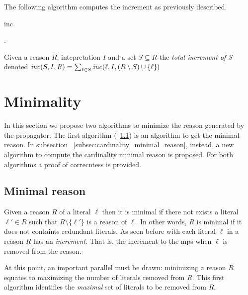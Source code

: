 The following algorithm computes the increment as previously described.
\begin{algorithm}[h]\small
    \caption{inc}
        \label{alg:increment}
        .
\end{algorithm}

Given a reason $R$, intepretation $I$ and a set $S \subseteq R$
the \textit{total increment of S} denoted $\mathit{inc}(S,I,R) = \sum_{\ell \in S} \mathit{inc}(\ell, I, (R \setminus S)\cup \{\ell\})$ 

\section{Minimality}
\label{sec:minimality}
In this section we  propose two algorithms to minimize the reason 
generated by the propagator. The first algorithm  (~\ref{subsec:minimal_reason}) is an algorithm
to get the minimal reason.
In subsection ~\ref{subsec:cardinality_minimal_reason}, instead,
a new algorithm to compute the cardinality minimal reason is proposed.
For both algorithms a proof of correcntess is provided.

\subsection{Minimal reason}
\label{subsec:minimal_reason}

Given a reason $R$ of a literal $\ell$ then it is minimal if there  not exists 
a literal $\ell' \in R$ such that $R \setminus \{\ell'\}$ is a reason of 
$\ell$. In other words, $R$ is minimal if it does not containts redundant literals.
As seen before with each literal $\ell$ in a reason $R$ has an \textit{increment}.
That is, the increment to the mps when  $\ell$ is removed from the reason.

At this point, an important parallel must be drawn: 
minimizing a reason \(R\) equates to maximizing the
number of literals removed from \(R\). 
This first algorithm identifies the \textit{maximal} 
set of literals to be removed from \(R\).

